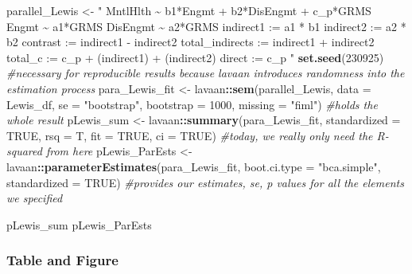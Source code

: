 \documentclass[
  11pt,
]{book}
\newenvironment{Shaded}{\begin{snugshade}}{\end{snugshade}}
\newcommand{\AttributeTok}[1]{\textcolor[rgb]{0.27,0.27,0.27}{#1}}
\newcommand{\CommentTok}[1]{\textcolor[rgb]{0.37,0.37,0.37}{\textit{#1}}}
\newcommand{\ConstantTok}[1]{\textcolor[rgb]{0.37,0.37,0.37}{#1}}
\newcommand{\DecValTok}[1]{\textcolor[rgb]{0.06,0.06,0.06}{#1}}
\newcommand{\FunctionTok}[1]{\textcolor[rgb]{0.27,0.27,0.27}{\textbf{#1}}}
\newcommand{\NormalTok}[1]{#1}
\newcommand{\OtherTok}[1]{\textcolor[rgb]{0.37,0.37,0.37}{#1}}
\newcommand{\SpecialCharTok}[1]{\textcolor[rgb]{0.43,0.43,0.43}{\textbf{#1}}}
\newcommand{\StringTok}[1]{\textcolor[rgb]{0.5,0.5,0.5}{#1}}
\begin{document}
\begin{Shaded}
\begin{Highlighting}[]
\NormalTok{parallel\_Lewis }\OtherTok{\textless{}{-}} \StringTok{"}
\StringTok{    MntlHlth \textasciitilde{} b1*Engmt + b2*DisEngmt + c\_p*GRMS}
\StringTok{    Engmt \textasciitilde{} a1*GRMS    }
\StringTok{    DisEngmt \textasciitilde{} a2*GRMS}
\StringTok{    }
\StringTok{    indirect1 := a1 * b1}
\StringTok{    indirect2 := a2 * b2}
\StringTok{    contrast := indirect1 {-} indirect2}
\StringTok{    total\_indirects := indirect1 + indirect2}
\StringTok{    total\_c := c\_p + (indirect1) + (indirect2)}
\StringTok{    direct := c\_p}
\StringTok{"}
\FunctionTok{set.seed}\NormalTok{(}\DecValTok{230925}\NormalTok{)  }\CommentTok{\#necessary for reproducible results because lavaan introduces randomness into the estimation process}
\NormalTok{para\_Lewis\_fit }\OtherTok{\textless{}{-}}\NormalTok{ lavaan}\SpecialCharTok{::}\FunctionTok{sem}\NormalTok{(parallel\_Lewis, }\AttributeTok{data =}\NormalTok{ Lewis\_df, }\AttributeTok{se =} \StringTok{"bootstrap"}\NormalTok{,}
    \AttributeTok{bootstrap =} \DecValTok{1000}\NormalTok{, }\AttributeTok{missing =} \StringTok{"fiml"}\NormalTok{)  }\CommentTok{\#holds the \textquotesingle{}whole\textquotesingle{} result}
\NormalTok{pLewis\_sum }\OtherTok{\textless{}{-}}\NormalTok{ lavaan}\SpecialCharTok{::}\FunctionTok{summary}\NormalTok{(para\_Lewis\_fit, }\AttributeTok{standardized =} \ConstantTok{TRUE}\NormalTok{, }\AttributeTok{rsq =}\NormalTok{ T,}
    \AttributeTok{fit =} \ConstantTok{TRUE}\NormalTok{, }\AttributeTok{ci =} \ConstantTok{TRUE}\NormalTok{)  }\CommentTok{\#today, we really only need the R{-}squared from here    }
\NormalTok{pLewis\_ParEsts }\OtherTok{\textless{}{-}}\NormalTok{ lavaan}\SpecialCharTok{::}\FunctionTok{parameterEstimates}\NormalTok{(para\_Lewis\_fit, }\AttributeTok{boot.ci.type =} \StringTok{"bca.simple"}\NormalTok{,}
    \AttributeTok{standardized =} \ConstantTok{TRUE}\NormalTok{)  }\CommentTok{\#provides our estimates, se, p values for all the elements we specified}

\NormalTok{pLewis\_sum}
\NormalTok{pLewis\_ParEsts}
\end{Highlighting}
\end{Shaded}

\hypertarget{table-and-figure}{%
\subsubsection{Table and Figure}\label{table-and-figure}}
\end{document}
